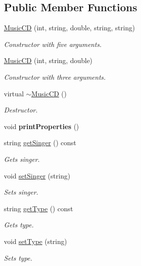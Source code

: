 \subsection*{Public Member Functions}
\begin{DoxyCompactItemize}
\item 
\hyperlink{classMusicCD_a334b0680f6901e6d4f34791aecf075fd}{Music\+CD} (int, string, double, string, string)
\begin{DoxyCompactList}\small\item\em Constructor with five arguments. \end{DoxyCompactList}\item 
\hyperlink{classMusicCD_aecdf5af2b88efcd0f3e0d5722f0316d3}{Music\+CD} (int, string, double)
\begin{DoxyCompactList}\small\item\em Constructor with three arguments. \end{DoxyCompactList}\item 
\mbox{\label{classMusicCD_ab484d97087a7eb43716b2f96da6b44d1}} 
virtual \hyperlink{classMusicCD_ab484d97087a7eb43716b2f96da6b44d1}{$\sim$\+Music\+CD} ()
\begin{DoxyCompactList}\small\item\em Destructor. \end{DoxyCompactList}\item 
\mbox{\label{classMusicCD_a86f5945b7f17a544ccb286e38058b550}} 
void {\bfseries print\+Properties} ()
\item 
string \hyperlink{classMusicCD_afb4af62b3ba9ba78ee348a94c0fb2a21}{get\+Singer} () const
\begin{DoxyCompactList}\small\item\em Gets singer. \end{DoxyCompactList}\item 
void \hyperlink{classMusicCD_a1a425710dfc010eb5f2bbde63d53f89d}{set\+Singer} (string)
\begin{DoxyCompactList}\small\item\em Sets singer. \end{DoxyCompactList}\item 
string \hyperlink{classMusicCD_aa60af83051f83827e56b7ebaf3d459d2}{get\+Type} () const
\begin{DoxyCompactList}\small\item\em Gets type. \end{DoxyCompactList}\item 
void \hyperlink{classMusicCD_a1b1ea75abec58c4154dee842f9833995}{set\+Type} (string)
\begin{DoxyCompactList}\small\item\em Sets type. \end{DoxyCompactList}\end{DoxyCompactItemize}


